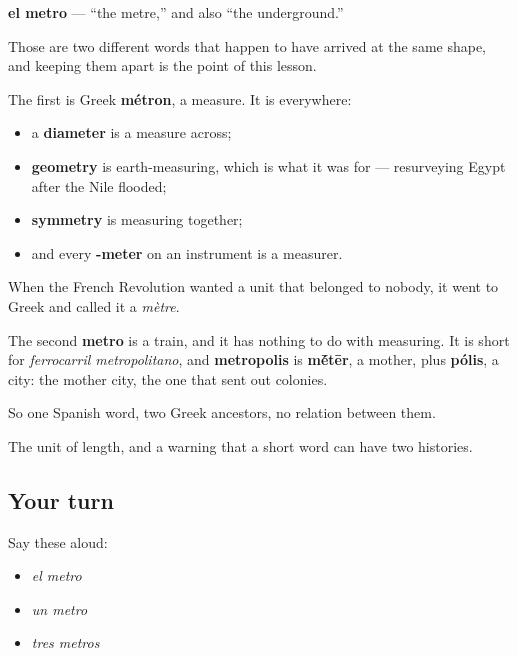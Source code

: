 \begin{cousinweb}
\textbf{el metro} — \textquotedblleft{}the metre,\textquotedblright{} and also \textquotedblleft{}the underground.\textquotedblright{}

Those are two different words that happen to have arrived at the same shape, and keeping them apart is the point of this lesson.

The first is Greek \textbf{métron}, a measure. It is everywhere:

\begin{itemize}
\raggedright
  \item a \textbf{diameter} is a measure across;
  \item \textbf{geometry} is earth-measuring, which is what it was for — resurveying Egypt after the Nile flooded;
  \item \textbf{symmetry} is measuring together;
  \item and every \textbf{-meter} on an instrument is a measurer.
\end{itemize}

When the French Revolution wanted a unit that belonged to nobody, it went to Greek and called it a \emph{mètre}.

The second \textbf{metro} is a train, and it has nothing to do with measuring. It is short for \emph{ferrocarril metropolitano}, and \textbf{metropolis} is \textbf{m\'{\={e}}tēr}, a mother, plus \textbf{pólis}, a city: the mother city, the one that sent out colonies.

So one Spanish word, two Greek ancestors, no relation between them.
\end{cousinweb}

\begin{grammarlens}[title={What you've built}]
The unit of length, and a warning that a short word can have two histories.
\end{grammarlens}

\subsection*{Your turn}
Say these aloud:

\begin{itemize}
\raggedright
  \item \emph{el metro}
  \item \emph{un metro}
  \item \emph{tres metros}
\end{itemize}

